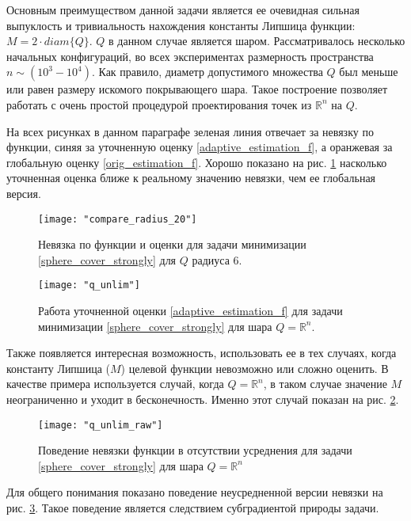 Основным преимуществом данной задачи является ее очевидная сильная выпуклость и тривиальность нахождения константы Липшица функции: $ M = 2 \cdot diam\{Q\} $. $Q$ в данном случае является шаром.
Рассматривалось несколько начальных конфигураций, во всех экспериментах размерность пространства $n \sim (10^3 - 10^4)$. Как правило, диаметр допустимого множества $Q$ был меньше или равен размеру искомого покрывающего шара. Такое построение позволяет работать с очень простой процедурой проектирования точек из $\mathbb{R}^n$ на $Q$.

На всех рисунках в данном параграфе зеленая линия отвечает за невязку по функции, синяя за уточненную оценку \eqref{adaptive_estimation_f}, а оранжевая за глобальную оценку \eqref{orig_estimation_f}. Хорошо показано на рис. \ref{r_20_q_6} насколько уточненная оценка ближе к реальному значению невязки, чем ее глобальная версия. 

\begin{figure}[h]
	\centering
	\texttt{[image: "compare\_radius\_20"]}
    \caption{Невязка по функции и оценки для задачи минимизации \eqref{sphere_cover_strongly} для $Q$ радиуса 6.}
    \label{r_20_q_6}
\end{figure}

\begin{figure}[h]
	\centering
	\texttt{[image: "q\_unlim"]}
    \caption{Работа уточненной оценки \eqref{adaptive_estimation_f} для задачи минимизации \eqref{sphere_cover_strongly} для шара $Q = \mathbb{R}^n$.}
    \label{q_unlim}
\end{figure}

Также появляется интересная возможность, использовать ее в тех случаях, когда константу Липшица ($M$) целевой функции невозможно или сложно оценить. В качестве примера используется случай, когда $Q = \mathbb{R}^n$, в таком случае значение $M$ неограниченно и уходит в бесконечность. Именно этот случай показан на рис. \ref{q_unlim}. 

\begin{figure}[h]
	\centering
	\texttt{[image: "q\_unlim\_raw"]}
    \caption{Поведение невязки функции в отсутствии усреднения для задачи \eqref{sphere_cover_strongly} для шара $Q = \mathbb{R}^n$}
    \label{non_avg}
\end{figure}

Для общего понимания показано поведение неусредненной версии невязки на рис. \ref{non_avg}. Такое поведение является следствием субградиентой природы задачи. 

